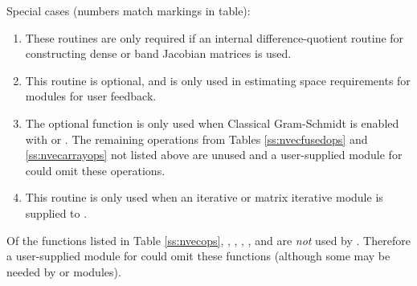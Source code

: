 Special cases (numbers match markings in table):
\begin{enumerate}
\item These routines are only required if an internal
  difference-quotient routine for constructing dense or band
  Jacobian matrices is used.
\item This routine is optional, and is only used in estimating
  space requirements for {\idas} modules for user feedback.
\item The optional function  is only used
  when Classical Gram-Schmidt is enabled with {\spgmr} or
  {\spfgmr}. The remaining operations from Tables \ref{ss:nvecfusedops}
  and \ref{ss:nvecarrayops} not listed above are unused and a
  user-supplied {\nvector} module for {\idas} could omit these
  operations.
\item This routine is only used when an iterative or matrix iterative
  {\sunlinsol} module is supplied to {\idas}.
\end{enumerate}

Of the functions listed in Table \ref{ss:nvecops}, ,
, , , and
 are {\em not} used by
{\idas}. Therefore a user-supplied {\nvector} module for {\idas} could
omit these functions (although some may be needed by {\sunnonlinsol}
or {\sunlinsol} modules).
















